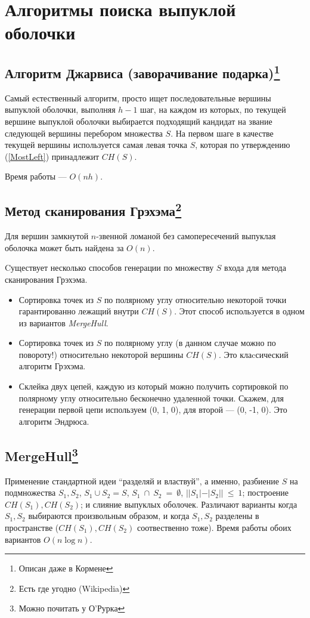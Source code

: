 \section{Алгоритмы поиска выпуклой оболочки}

\subsection[title]{Алгоритм Джарвиса (заворачивание подарка)\footnote{Описан даже в Кормене}}
Самый естественный алгоритм, просто ищет последовательные вершины выпуклой оболочки, выполняя $h - 1$ шаг, 
на каждом из которых, по текущей вершине выпуклой оболочки выбирается подходящий кандидат на звание 
следующей вершины перебором множества $S$. На первом шаге в качестве текущей вершины используется самая левая точка $S$,
которая по утверждению (\ref{MostLeft}) принадлежит $CH(S)$. 

Время работы --- $O(n h)$.

\subsection[title]{Метод сканирования Грэхэма\footnote{Есть где угодно (Wikipedia)}}
\begin{statement}
Для вершин замкнутой $n$-звенной ломаной без самопересечений выпуклая оболочка может быть найдена за $O(n)$.
\end{statement}

Cуществует несколько способов генерации по множеству $S$ входа для метода сканирования Грэхэма.
\begin{itemize}
\item Сортировка точек из $S$ по полярному углу относительно некоторой точки гарантированно лежащий внутри $CH(S)$. 
  Этот способ используется в одном из вариантов \textit{MergeHull}.
\item Сортировка точек из $S$ по полярному углу (в данном случае можно по повороту!) относительно некоторой вершины $CH(S)$. 
  Это клаcсический алгоритм Грэхэма.
\item Склейка двух цепей, каждую из который можно получить сортировкой по полярному углу относительно 
  бесконечно удаленной точки. Скажем, для генерации первой цепи используем (0, 1, 0), для второй --- (0, -1, 0).
  Это алгоритм Эндрюса.
\end{itemize}

\subsection[title]{MergeHull\footnote{Можно почитать у О'Рурка}}
Применение стандартной идеи ``разделяй и властвуй'', а именно, разбиение $S$ на подмножества $S_1, S_2$, 
$S_1 \cup S_2 = S$, $S_1~\cap~S_2~=~\emptyset$, $||S_1| - |S_2||~\le~1$; построение $CH(S_1), CH(S_2)$; и слияние 
выпуклых оболочек. Различают варианты когда $S_1, S_2$ выбираются произвольным образом, 
и когда $S_1, S_2$ разделены в пространстве ($CH(S_1), CH(S_2)$ соотвественно тоже). Время работы обоих вариантов 
$O(n \log n)$.

